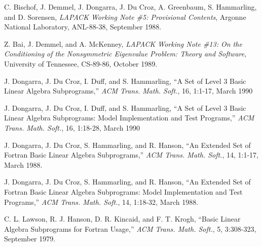 C. Bischof, J. Demmel, J. Dongarra, J. Du Croz, A. Greenbaum,
S. Hammarling, and D. Sorensen,
{\em LAPACK Working Note \#5:  Provisional Contents},
Argonne National Laboratory, ANL-88-38, September 1988.

Z. Bai, J. Demmel, and A. McKenney,
{\em LAPACK Working Note \#13: On the Conditioning of the Nonsymmetric
Eigenvalue Problem:  Theory and Software}, 
University of Tennessee, CS-89-86, October 1989.
 
J. Dongarra, J. Du Croz, I. Duff, and S. Hammarling,
``A Set of Level 3 Basic Linear Algebra Subprograms,''
{\em ACM Trans. Math. Soft.}, 16, 1:1-17, March 1990

J. Dongarra, J. Du Croz, I. Duff, and S. Hammarling,
``A Set of Level 3 Basic Linear Algebra Subprograms:
Model Implementation and Test Programs,''
{\em ACM Trans. Math. Soft.}, 16, 1:18-28, March 1990

J. Dongarra, J. Du Croz, S. Hammarling, and R. Hanson,
``An Extended Set of Fortran Basic Linear Algebra Subprograms,''
{\em ACM Trans. Math. Soft.}, 14, 1:1-17, March 1988.

J. Dongarra, J. Du Croz, S. Hammarling, and R. Hanson,
``An Extended Set of Fortran Basic Linear Algebra Subprograms:
Model Implementation and Test Programs,''
{\em ACM Trans. Math. Soft.}, 14, 1:18-32, March 1988.

C. L. Lawson, R. J. Hanson, D. R. Kincaid, and F. T. Krogh,
``Basic Linear Algebra Subprograms for Fortran Usage,''
{\em ACM Trans. Math. Soft.}, 5, 3:308-323, September 1979.

\bibend


